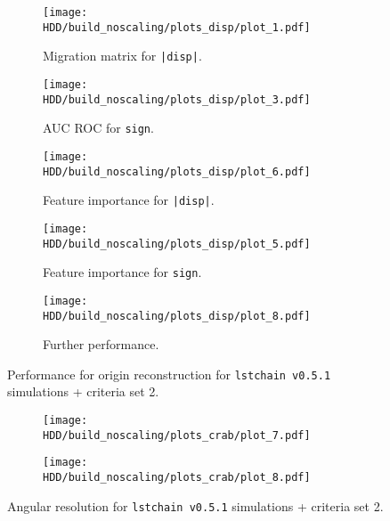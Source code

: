 \begin{figure}
    \centering
    \begin{subfigure}{0.49\textwidth}
        \centering
        \texttt{[image: HDD/build\_noscaling/plots\_disp/plot\_1.pdf]}
        \caption{Migration matrix for \texttt{|disp|}.}
        \label{fig:origin_oldMC_150_1}
    \end{subfigure}
    \hfill
    \begin{subfigure}{0.49\textwidth}
        \centering
        \texttt{[image: HDD/build\_noscaling/plots\_disp/plot\_3.pdf]}
        \caption{AUC ROC for \texttt{sign}.}
        \label{fig:origin_oldMC_150_2}
    \end{subfigure}
    \newline\vfill
    \begin{subfigure}{0.49\textwidth}
        \centering
        \texttt{[image: HDD/build\_noscaling/plots\_disp/plot\_6.pdf]}
        \caption{Feature importance for \texttt{|disp|}.}
        \label{fig:origin_oldMC_150_3}
    \end{subfigure}
    \hfill
    \begin{subfigure}{0.49\textwidth}
        \centering
        \texttt{[image: HDD/build\_noscaling/plots\_disp/plot\_5.pdf]}
        \caption{Feature importance for \texttt{sign}.}
        \label{fig:origin_oldMC_150_4}
    \end{subfigure}
    \newline\vfill
    \begin{subfigure}{0.49\textwidth}
        \centering
        \texttt{[image: HDD/build\_noscaling/plots\_disp/plot\_8.pdf]}
        \caption{Further performance.}
        \label{fig:origin_oldMC_150_4}
    \end{subfigure}
    \caption{Performance for origin reconstruction for \texttt{lstchain v0.5.1} simulations + criteria set 2.}
\end{figure}

\begin{figure}
    \centering
    \begin{subfigure}{0.49\textwidth}
        \centering
        \texttt{[image: HDD/build\_noscaling/plots\_crab/plot\_7.pdf]}
        \label{fig:ang_res_oldMC_150_1}
    \end{subfigure}
    \hfill
    \begin{subfigure}{0.49\textwidth}
        \centering
        \texttt{[image: HDD/build\_noscaling/plots\_crab/plot\_8.pdf]}
        \label{fig:ang_res_oldMC_150_2}
    \end{subfigure}
    \caption{Angular resolution for \texttt{lstchain v0.5.1} simulations + criteria set 2.}
\end{figure}

